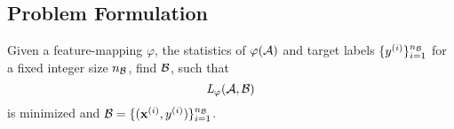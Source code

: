 \subsection{Problem Formulation}
Given a feature-mapping $\varphi$, the statistics of $\varphi(\mathcal A)$
and target labels $\{y^{(i)}\}_{i=1}^{n_{\mathcal B}}$ for a fixed integer size $n_{\mathcal B}$,
find $\mathcal B$, such that
\[
     \textit{L} _\varphi (\mathcal A, \mathcal B)
\]
is minimized and $\mathcal B = \{(\mathbf x^{(i)}, y^{(i)})\}_{i=1}^{n_{\mathcal B}}$.

    






